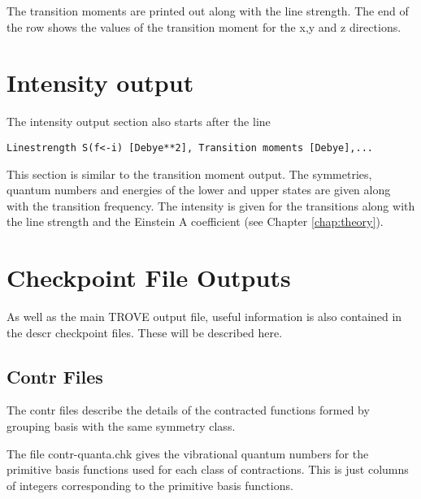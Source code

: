 The transition moments are printed out along with the line strength. The end of the row shows the values of the 
transition moment for the x,y and z directions. 


\section{Intensity output}

The intensity output section also starts after the line
\begin{verbatim}
Linestrength S(f<-i) [Debye**2], Transition moments [Debye],... 
\end{verbatim}

This section is similar to the transition moment output. The symmetries, quantum numbers and energies of the lower 
and upper states are given along with the transition frequency. The intensity is given for the transitions along with the
line strength and the Einstein A coefficient (see Chapter \ref{chap:theory}). 


\section{Checkpoint File Outputs}


As well as the main TROVE output file, useful information is also contained in the descr checkpoint files. These will be 
described here.

\subsection{Contr Files}

The contr files describe the details of the contracted functions formed by grouping basis with the same symmetry class.

The file contr-quanta.chk gives the vibrational quantum numbers for the primitive basis functions used for each 
class of contractions. This is just columns of integers corresponding to the primitive basis functions.

